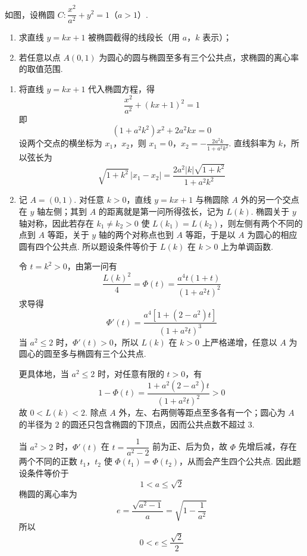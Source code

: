 \begin{problem}
如图，设椭圆 \( C:\dfrac{x^2}{a^2}+y^2=1 \)（\( a>1 \)）.

\begin{enumerate}
\item 求直线 \( y=kx+1 \) 被椭圆截得的线段长（用 \(a\)，\(k\) 表示）；
\item 若任意以点 \( A(0,1) \) 为圆心的圆与椭圆至多有三个公共点，求椭圆的离心率的取值范围.
\end{enumerate}

\end{problem}

\begin{solution}
\begin{enumerate}
\item 将直线 \(y=kx+1\) 代入椭圆方程，得
\[
\frac{x^2}{a^2}+(kx+1)^2=1
\]
即
\[
(1+a^2k^2)x^2+2a^2kx=0
\]
设两个交点的横坐标为 \(x_1\)，\(x_2\)，则
\(x_1=0\)，\(x_2=-\frac{2a^2k}{1+a^2k^2}\).
直线斜率为 \(k\)，所以弦长为
\[
\sqrt{1+k^2}\,|x_1-x_2|
=\frac{2a^2|k|\sqrt{1+k^2}}{1+a^2k^2}
\]

\item 记 \(A=(0,1)\). 对任意 \(k>0\)，直线 \(y=kx+1\) 与椭圆除 \(A\) 外的另一个交点在 \(y\) 轴左侧；其到 \(A\) 的距离就是第一问所得弦长，记为 \(L(k)\). 椭圆关于 \(y\) 轴对称，因此若存在 \(k_1\ne k_2>0\) 使 \(L(k_1)=L(k_2)\)，则左侧有两个不同的点到 \(A\) 等距，关于 \(y\) 轴的两个对称点也到 \(A\) 等距，于是以 \(A\) 为圆心的相应圆有四个公共点. 所以题设条件等价于 \(L(k)\) 在 \(k>0\) 上为单调函数.

令 \(t=k^2>0\)，由第一问有
\[
\frac{L(k)^2}{4}
=\Phi(t)
=\frac{a^4t(1+t)}{(1+a^2t)^2}
\]
求导得
\[
\Phi'(t)=\frac{a^4\left[1+(2-a^2)t\right]}{(1+a^2t)^3}
\]
当 \(a^2\leqslant2\) 时，\(\Phi'(t)>0\)，所以 \(L(k)\) 在 \(k>0\) 上严格递增，任意以 \(A\) 为圆心的圆至多与椭圆有三个公共点.

更具体地，当 \(a^2\leqslant2\) 时，对任意有限的 \(t>0\)，有
\[
1-\Phi(t)=\frac{1+a^2(2-a^2)t}{(1+a^2t)^2}>0
\]
故 \(0<L(k)<2\). 除点 \(A\) 外，左、右两侧等距点至多各有一个；圆心为 \(A\) 的半径为 \(2\) 的圆还只包含椭圆的下顶点，因而公共点数不超过 \(3\).

当 \(a^2>2\) 时，\(\Phi'(t)\) 在 \(t=\dfrac1{a^2-2}\) 前为正、后为负，故 \(\Phi\) 先增后减，存在两个不同的正数 \(t_1\)，\(t_2\) 使 \(\Phi(t_1)=\Phi(t_2)\)，从而会产生四个公共点. 因此题设条件等价于
\[
1<a\leqslant\sqrt2
\]
椭圆的离心率为
\[
e=\frac{\sqrt{a^2-1}}{a}=\sqrt{1-\frac1{a^2}}
\]
所以
\[
0<e\leqslant\frac{\sqrt2}{2}
\]
\end{enumerate}
\end{solution}

